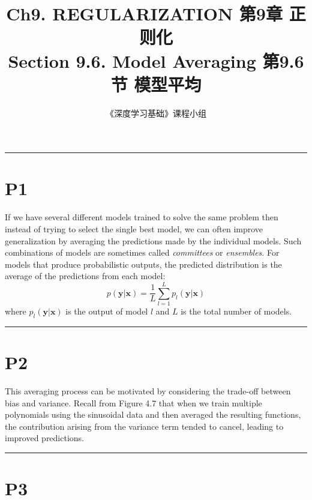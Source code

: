 \documentclass{article}
\title{Ch9. REGULARIZATION \hfill 第9章 正则化 \\ 
Section 9.6. Model Averaging \hfill 第9.6节 模型平均}
\author{《深度学习基础》课程小组}
\begin{document}
\maketitle

\setlength{\parindent}{0pt} %
\setlength{\parskip}{1.5em} %

\noindent\rule{\linewidth}{0.4pt}

\section{P1}

If we have several different models trained to solve the same problem then instead of trying to select the single best model, we can often improve generalization by averaging the predictions made by the individual models. Such combinations of models are sometimes called \textit{committees} or \textit{ensembles}. For models that produce probabilistic outputs, the predicted distribution is the average of the predictions from each model:
\begin{equation}
p(\mathbf{y}|\mathbf{x}) = \frac{1}{L} \sum_{l=1}^{L} p_l(\mathbf{y}|\mathbf{x})
\tag{9.42}
\end{equation}
where $p_l(\mathbf{y}|\mathbf{x})$ is the output of model $l$ and $L$ is the total number of models.

\noindent\rule{\linewidth}{0.4pt}

\section{P2}

This averaging process can be motivated by considering the trade-off between bias and variance. Recall from Figure 4.7 that when we train multiple polynomials using the sinusoidal data and then averaged the resulting functions, the contribution arising from the variance term tended to cancel, leading to improved predictions.

\noindent\rule{\linewidth}{0.4pt}

\section{P3}
\end{document}
